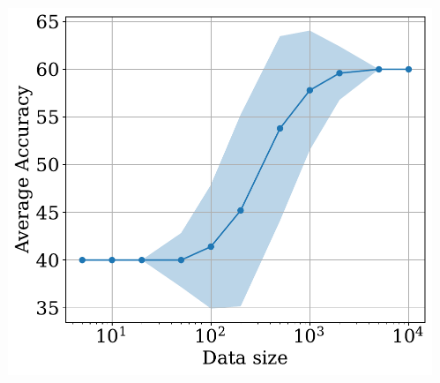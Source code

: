 \begin{figure}
\centering
    \begin{minipage}{0.45\textwidth}
    \includegraphics[width = \linewidth]{plots/accuracy.pdf}
    \end{minipage}
\end{figure}
